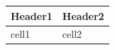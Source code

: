 \begin{table}[htbp]\centering
\begin{tabular}{ll}
\toprule Header1 & Header2 \\
\midrule cell1 & cell2 \\
\bottomrule
\end{tabular}
\end{table}

